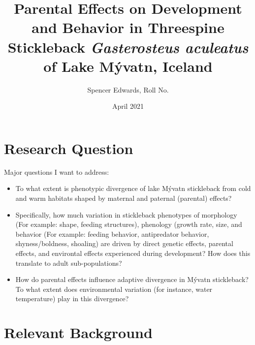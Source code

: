 \documentclass[12pt]{extarticle}
\title{Parental Effects on Development and Behavior in Threespine Stickleback \textit{Gasterosteus aculeatus} of Lake M\'yvatn, Iceland}
\author{Spencer Edwards, Roll No.}
\date{April 2021}
\begin{document}
\maketitle

\section*{Research Question}
Major questions I want to address:
\begin{itemize}
 \item To what extent is phenotypic divergence of lake M\'yvatn stickleback from cold and warm habitats
shaped by maternal and paternal (parental) effects?
 \item Specifically, how much variation in stickleback phenotypes  of morphology (For example:  shape, feeding structures), phenology (growth rate, size,  and behavior (For example: feeding behavior, antipredator behavior, shyness/boldness, shoaling) are driven by direct genetic effects, parental effects, and environtal effects experienced during development? How does this translate to adult sub-populations?
 \item How do parental effects influence adaptive divergence in M\'yvatn stickleback? To what extent does environmental variation (for instance, water temperature) play in this divergence?
\end{itemize}

\section*{Relevant Background}
\end{document}
